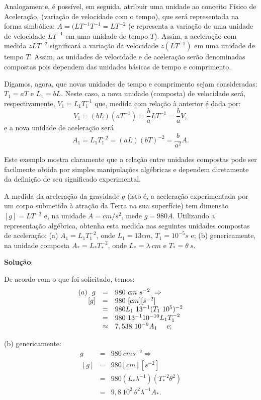     Analogamente, é possível, em seguida, atribuir uma unidade ao conceito Físico de Aceleração, (variação de velocidade com o tempo), que será representada na forma simbólica: \(A = (LT^{-1}T^{-1}=LT^{-2}\) (e representa a variação de uma unidade de velocidade \(LT^{-1}\) em uma unidade de tempo \(T\)). Assim, a aceleração com medida \(zLT^{-2}\) significará a variação da velocidade \(z(LT^{-1})\) em uma unidade de tempo \(T\). Assim, as unidades de velocidade e de aceleração serão denominadas compostas pois dependem das unidades básicas de tempo e comprimento.

    Digamos, agora, que novas unidades de tempo e comprimento sejam consideradas: \(T_1 = aT\) e \(L_1 = bL\). Neste caso, a nova unidade (composta) de velocidade será, respectivamente, \(V_1 = L_1T_1^{-1}\) que, medida com relação à anterior é dada por:
    \[
    V_1
    = (bL)(aT^{-1})
    = \dfrac{b}{a}LT^{-1}
    = \dfrac{b}{a} V,\]
    e a nova unidade de aceleração será
    \[A_1 = L_1T_1^{-2}=(aL)(bT)^{-2}=\dfrac{b}{a^2} A.\]

    Este exemplo mostra claramente que a relação entre unidades compostas pode ser facilmente obtida por simples manipulações algébricas e dependem diretamente da definição de seu significado experimental.

\begin{exercise}
    A medida da aceleração da gravidade \(g\) (isto é, a aceleração experimentada por um corpo submetido à atração da Terra na sua superfície) tem dimensão \([g] = LT^{-2}\) e, na unidade \(A = cm/ s^2\), mede \(g = 980 A\). Utilizando a representação algébrica, obtenha esta medida nas seguintes unidades compostas de aceleração: (a) \(A_1=L_1T_1^{-2}\), onde \(L_1 = 13 cm\), \(T_1 = 10^{-5} s\) e; (b) genericamente, na unidade composta \(A_{\ast} = L_{\ast} T_{\ast}^{-2}\), onde \(L_{\ast} = \lambda\ cm\) e \(T_{\ast} = \theta\ s\).
\end{exercise}

    \textbf{Solução}:
    {\color{orange}
    De acordo com o que foi solicitado, temos:
    \[\begin{array}{rcl}
    (a)\ \ g &=& 980\ cm\ s^{-2}\ \Rightarrow \\
    \ [g]
    &=& 980\ [cm] [s^{-2}] \\
    &=& 980 L_1\ 13^{-1} (T_1\ 10^{5})^{-2} \\
    &=& 980\ 13^{-1}  10^{-10} L_1 T_1^{-2} \\
    &\approx& 7,538\ 10^{-9} A_1 \mbox{ \quad e;}
    \end{array}\]
    
    (b) genericamente:
    \[\begin{array}{rcl}
    g &=& 980\ cm s^{-2} \Rightarrow \\
    \ [g] &=& 980 [cm] [s^{-2}] \\
    &=& 980 (L_\ast \lambda^{-1}) (T_\ast^{-2} \theta^2) \\
    &=& 9,8\ 10^2\ \theta^2 \lambda^{-1} A_\ast.
    \end{array}\]
    }


